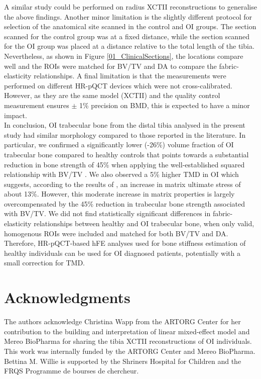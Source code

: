 \documentclass[a4paper,fleqn]{DC_ArtStyle}
\begin{document}
	A similar study could be performed on radius XCTII reconstructions to generalise the above findings. Another minor limitation is the slightly different protocol for selection of the anatomical site scanned in the control and OI groups. The section scanned for the control group was at a fixed distance, while the section scanned for the OI group was placed at a distance relative to the total length of the tibia. Nevertheless, as shown in Figure \ref{01_ClinicalSections}, the locations compare well and the ROIs were matched for BV/TV and DA to compare the fabric-elas\-ticity relationships. A final limitation is that the measurements were performed on different HR-pQCT devices which were not cross-calibrated. However, as they are the same model (XCTII) and the quality control measurement ensures $\pm$ 1\% precision on BMD, this is expected to have a minor impact. \\
	
	In conclusion, OI trabecular bone from the distal tibia analysed in the present study had similar morphology compared to those reported in the literature. In particular, we confirmed a significantly lower (-26\%) volume fraction of OI trabecular bone compared to healthy controls that points towards a substantial reduction in bone strength of 45\% when applying the well-established squared relationship with BV/\-TV \cite{Fleps2020}. 
	We also observed a 5\% higher TMD in OI %
	which suggests, according to the results of \citeauthor{Indermaur2021}\cite{Indermaur2021}, an increase in matrix ultimate stress of about 13\%. %
	However, this moderate increase in matrix properties is large\-ly overcompensated by the 45\% reduction in trabecular bone strength associated with BV/TV. %
	We did not find statistically significant differences in fabric-elasticity relationships between healthy and OI trabecular bone, when only valid, homogenous ROIs were included and matched for both BV/TV and DA. Therefore, HR-pQCT-based hFE analyses used for bone stiffness estimation of healthy individuals can be used for OI diagnosed patients, potentially with a small correction for TMD.

	
	\section*{Acknowledgments}
	The authors acknowledge Christina Wapp from the ARTORG Center for her contribution to the building and interpretation of linear mixed-effect model and Mereo BioPharma for sharing the tibia XCTII reconstructions of OI individuals. This work was internally funded by the ARTORG Center and Mereo BioPharma.  Bettina M. Willie is supported by the Shriners Hospital for Children and the FRQS Programme de bourses de chercheur. 
	
\end{document}
